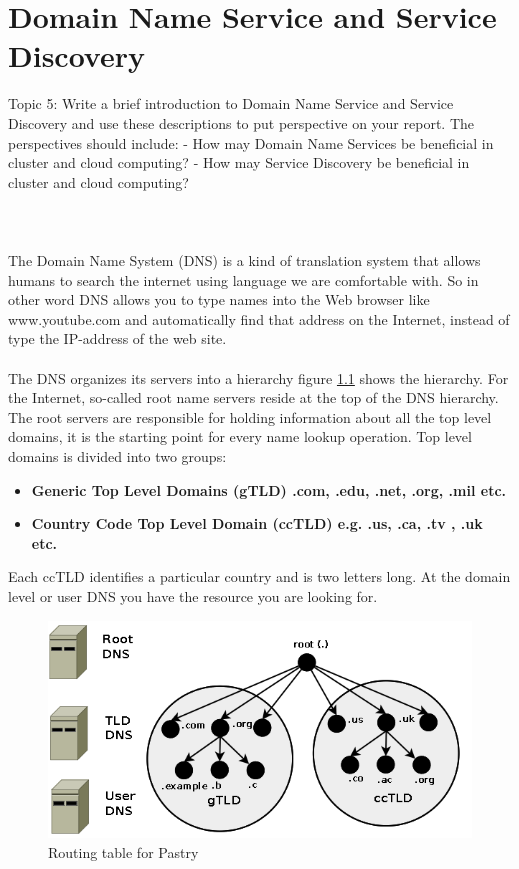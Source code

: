 \chapter{Domain Name Service and Service Discovery}\label{ch:dns}
Topic 5: Write a brief introduction to Domain Name Service and Service Discovery and use these descriptions to put perspective on your report. The perspectives should include:
- How may Domain Name Services be beneficial in cluster and cloud computing?
- How may Service Discovery be beneficial in cluster and cloud computing?\\ \\ \\ \\

The Domain Name System (DNS) is a kind of translation system that allows humans to search the internet using language we are comfortable with. So in other word DNS allows you to type names into the Web browser like www.youtube.com and automatically find that address on the Internet, instead of type the IP-address of the web site.
\\ \\
The DNS organizes its servers into a hierarchy figure \ref{fig:DNShierarchy} shows the hierarchy. For the Internet, so-called root name servers reside at the top of the DNS hierarchy. The root servers are responsible for holding information about all the top level domains, it is the starting point for every name lookup operation. Top level domains is divided into two groups:

\begin{itemize}
\item \textbf{Generic Top Level Domains (gTLD) .com, .edu, .net, .org, .mil etc.}
\item \textbf{ Country Code Top Level Domain (ccTLD) e.g. .us, .ca, .tv , .uk etc.}
\end{itemize}

Each ccTLD identifies a particular country and is two letters long. 
At the domain level or user DNS you have the resource you are looking for.
\begin{figure}[bth]
\includegraphics[width=1\linewidth]{gfx/DNShierarchy}
\caption[routingtable]{Routing table for Pastry} \label{fig:DNShierarchy}
\end{figure}

